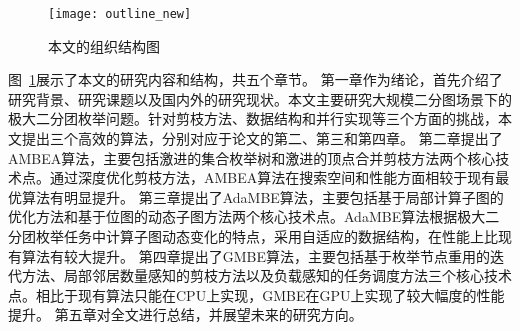 \begin{figure} [ht]
  \vspace{-0.2 in}
  \centering
  \texttt{[image: outline\_new]}
  \vspace{-0.05 in}
  \caption{本文的组织结构图}
  \label{fig:outline}
\end{figure}


图~\ref{fig:outline}展示了本文的研究内容和结构，共五个章节。
%
第一章作为绪论，首先介绍了研究背景、研究课题以及国内外的研究现状。本文主要研究大规模二分图场景下的极大二分团枚举问题。针对剪枝方法、数据结构和并行实现等三个方面的挑战，本文提出三个高效的算法，分别对应于论文的第二、第三和第四章。
%
第二章提出了AMBEA算法，主要包括激进的集合枚举树和激进的顶点合并剪枝方法两个核心技术点。通过深度优化剪枝方法，AMBEA算法在搜索空间和性能方面相较于现有最优算法有明显提升。
%
第三章提出了AdaMBE算法，主要包括基于局部计算子图的优化方法和基于位图的动态子图方法两个核心技术点。AdaMBE算法根据极大二分团枚举任务中计算子图动态变化的特点，采用自适应的数据结构，在性能上比现有算法有较大提升。
%
第四章提出了GMBE算法，主要包括基于枚举节点重用的迭代方法、局部邻居数量感知的剪枝方法以及负载感知的任务调度方法三个核心技术点。相比于现有算法只能在CPU上实现，GMBE在GPU上实现了较大幅度的性能提升。
%
第五章对全文进行总结，并展望未来的研究方向。















